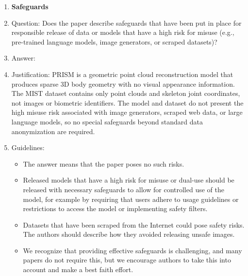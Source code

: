 \begin{enumerate}
\item {\bf Safeguards}
    \item[] Question: Does the paper describe safeguards that have been put in place for responsible release of data or models that have a high risk for misuse (e.g., pre-trained language models, image generators, or scraped datasets)?
    \item[] Answer: \answerNA{}
    \item[] Justification: PRISM is a geometric point cloud reconstruction model that produces sparse 3D body geometry with no visual appearance information. The MIST dataset contains only point clouds and skeleton joint coordinates, not images or biometric identifiers. The model and dataset do not present the high misuse risk associated with image generators, scraped web data, or large language models, so no special safeguards beyond standard data anonymization are required.
    \item[] Guidelines:
    \begin{itemize}
        \item The answer \answerNA{} means that the paper poses no such risks.
        \item Released models that have a high risk for misuse or dual-use should be released with necessary safeguards to allow for controlled use of the model, for example by requiring that users adhere to usage guidelines or restrictions to access the model or implementing safety filters.
        \item Datasets that have been scraped from the Internet could pose safety risks. The authors should describe how they avoided releasing unsafe images.
        \item We recognize that providing effective safeguards is challenging, and many papers do not require this, but we encourage authors to take this into account and make a best faith effort.
    \end{itemize}


\end{enumerate}
